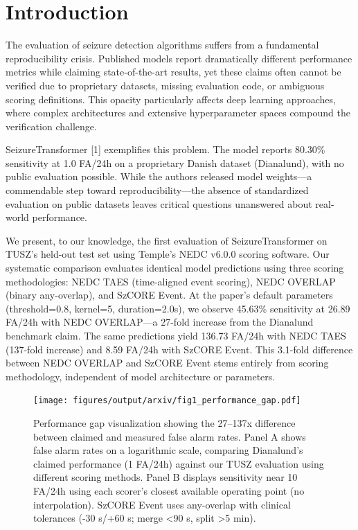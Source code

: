 \hypertarget{introduction}{%
\section{Introduction}\label{introduction}}

The evaluation of seizure detection algorithms suffers from a
fundamental reproducibility crisis. Published models report dramatically
different performance metrics while claiming state-of-the-art results,
yet these claims often cannot be verified due to proprietary datasets,
missing evaluation code, or ambiguous scoring definitions. This opacity
particularly affects deep learning approaches, where complex
architectures and extensive hyperparameter spaces compound the
verification challenge.

SeizureTransformer {[}1{]} exemplifies this problem. The model reports
80.30\% sensitivity at 1.0 FA/24h on a proprietary Danish dataset
(Dianalund), with no public evaluation possible. While the authors
released model weights---a commendable step toward reproducibility---the
absence of standardized evaluation on public datasets leaves critical
questions unanswered about real-world performance.

We present, to our knowledge, the first evaluation of SeizureTransformer
on TUSZ's held-out test set using Temple's NEDC v6.0.0 scoring software.
Our systematic comparison evaluates identical model predictions using
three scoring methodologies: NEDC TAES (time-aligned event scoring),
NEDC OVERLAP (binary any-overlap), and SzCORE Event. At the paper's
default parameters (threshold=0.8, kernel=5, duration=2.0s), we observe
45.63\% sensitivity at 26.89 FA/24h with NEDC OVERLAP---a 27-fold
increase from the Dianalund benchmark claim. The same predictions yield
136.73 FA/24h with NEDC TAES (137-fold increase) and 8.59 FA/24h with
SzCORE Event. This 3.1-fold difference between NEDC OVERLAP and SzCORE
Event stems entirely from scoring methodology, independent of model
architecture or parameters.

\begin{figure}
\hypertarget{fig:performance-gap}{%
\centering
\texttt{[image: figures/output/arxiv/fig1\_performance\_gap.pdf]}
\caption{Performance gap visualization showing the 27--137x difference
between claimed and measured false alarm rates. Panel A shows false
alarm rates on a logarithmic scale, comparing Dianalund's claimed
performance (1 FA/24h) against our TUSZ evaluation using different
scoring methods. Panel B displays sensitivity near 10 FA/24h using each
scorer's closest available operating point (no interpolation). SzCORE
Event uses any-overlap with clinical tolerances (-30 s/+60 s; merge
\textless90 s, split \textgreater5 min).}\label{fig:performance-gap}
}
\end{figure}

